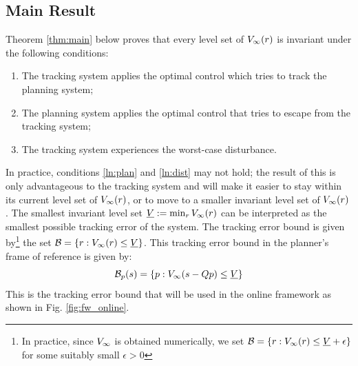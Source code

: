 \subsection{Main Result}
Theorem \ref{thm:main} below proves that every level set of $V_\infty(r)$ is invariant under the following conditions:
	\begin{enumerate}
		\item The tracking system applies the optimal control which tries to track the planning system;
		\item The planning system applies the optimal control that tries to escape from the tracking system; \label{ln:plan}
		\item The tracking system experiences the worst-case disturbance. \label{ln:dist}
	\end{enumerate}
In practice, conditions \ref{ln:plan} and \ref{ln:dist} may not hold; the result of this is only advantageous to the tracking system and will make it easier to stay within its current level set of $V_\infty(r)$, or to move to a smaller invariant level set of $V_\infty(r)$. The smallest invariant level set $\underline{V} := \min_{r} V_\infty(r)$ can be interpreted as the smallest possible tracking error of the system. The tracking error bound is given by\footnote{In practice, since $V_\infty$ is obtained numerically, we set $\mathcal B = \{r: V_\infty(r) \le \underline{V} + \epsilon\}$ for some suitably small $\epsilon>0$} the set $\mathcal B = \{r: V_\infty(r) \le \underline{V}\}$. This tracking error bound in the planner's frame of reference is given by:
		\begin{equation} \label{eq:TEBp}
		\mathcal B_p(s) = \{p: V_\infty(s-Qp) \le \underline{V}\}
		\end{equation}
This is the tracking error bound that will be used in the online framework as shown in Fig. \ref{fig:fw_online}.

